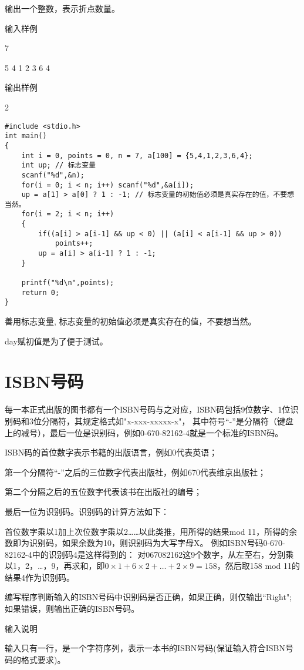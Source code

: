 输出一个整数，表示折点数量。

输入样例	

7

5 4 1 2 3 6 4

输出样例
	
2

\begin{lstlisting}
#include <stdio.h>
int main()
{
	int i = 0, points = 0, n = 7, a[100] = {5,4,1,2,3,6,4};
	int up; // 标志变量 
	scanf("%d",&n);
	for(i = 0; i < n; i++) scanf("%d",&a[i]);
	up = a[1] > a[0] ? 1 : -1; // 标志变量的初始值必须是真实存在的值，不要想当然。
	for(i = 2; i < n; i++)
	{
		if((a[i] > a[i-1] && up < 0) || (a[i] < a[i-1] && up > 0))
			points++;
		up = a[i] > a[i-1] ? 1 : -1;
	}
	
	printf("%d\n",points);
	return 0;
} 
\end{lstlisting}

\begin{note}[要点]
	善用标志变量, 标志变量的初始值必须是真实存在的值，不要想当然。
	
	day赋初值是为了便于测试。
\end{note}

\section{ISBN号码}
每一本正式出版的图书都有一个ISBN号码与之对应，ISBN码包括9位数字、1位识别码和3位分隔符，其规定格式如"x-xxx-xxxxx-x"，
其中符号“-”是分隔符（键盘上的减号），最后一位是识别码，例如0-670-82162-4就是一个标准的ISBN码。

ISBN码的首位数字表示书籍的出版语言，例如0代表英语；

第一个分隔符“-”之后的三位数字代表出版社，例如670代表维京出版社；

第二个分隔之后的五位数字代表该书在出版社的编号；

最后一位为识别码。识别码的计算方法如下：

首位数字乘以1加上次位数字乘以2……以此类推，用所得的结果mod 11，所得的余数即为识别码，如果余数为10，则识别码为大写字母X。
例如ISBN号码0-670-82162-4中的识别码4是这样得到的：
对067082162这9个数字，从左至右，分别乘以1，2，\dots，9，再求和，即$0\times 1+6\times 2+\dots +2\times 9=158$，然后取158 mod 11的结果4作为识别码。

编写程序判断输入的ISBN号码中识别码是否正确，如果正确，则仅输出``Right"; 如果错误，则输出正确的ISBN号码。

输入说明	

输入只有一行，是一个字符序列，表示一本书的ISBN号码(保证输入符合ISBN号码的格式要求)。


